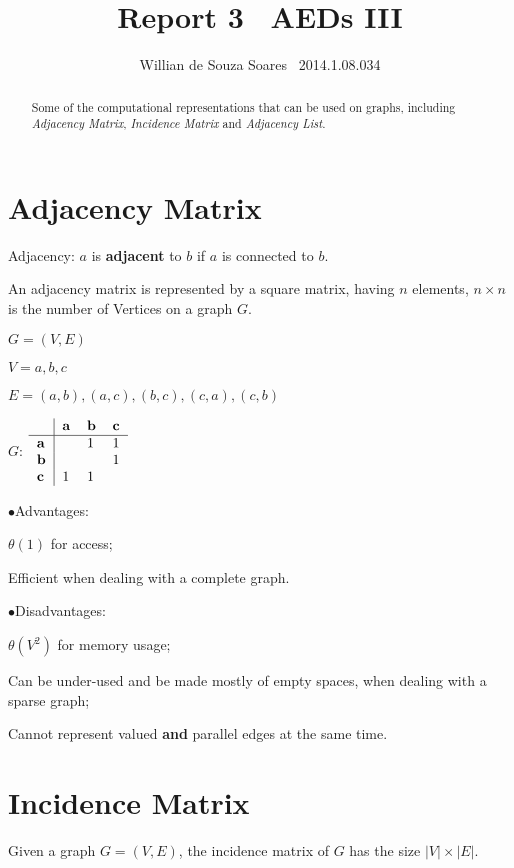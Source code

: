 \documentclass[10pt,a4paper]{article}
\author{Willian de Souza Soares \textendash\ 2014.1.08.034}
\title{Report 3 \textendash\ AEDs III}
\begin{document}
\maketitle
{}
\begin{abstract}
Some of the computational representations that can be used on graphs, including \emph{Adjacency Matrix}, \emph{Incidence Matrix} and \emph{Adjacency List}.
\end{abstract}
\section{Adjacency Matrix}
Adjacency: $a$ is \textbf{adjacent} to $b$ if $a$ is connected to $b$.

An adjacency matrix is represented by a square matrix, having $n$ elements, $n \times n$ is the number of Vertices on a graph $G$.

$G=(V,E)$

$V = {a,b,c}$

$E = {(a,b), (a,c), (b,c), (c,a), (c,b)}$

$G$:
$
\begin{tabular}{l|lll}
           & \textbf{a} & \textbf{b} & \textbf{c} \\ \hline
\textbf{a} &            & 1          & 1          \\
\textbf{b} &            &            & 1          \\
\textbf{c} & 1          & 1          &           
\end{tabular}
$

\begin{list}{$ \bullet $}{Advantages:}
\item $\theta (1) $ for access;
\item Efficient when dealing with a complete graph.
\end{list}
\begin{list}{$ \bullet $}{Disadvantages:}
\item $\theta (V^{2}) $ for memory usage;
\item Can be under-used and be made mostly of empty spaces, when dealing with a sparse graph;
\item Cannot represent valued \textbf{and} parallel edges at the same time.
\end{list}
\newpage
\section{Incidence Matrix}
Given a graph $G=(V,E)$, the incidence matrix of $G$ has the size $|V| \times |E|$.
\end{document}
